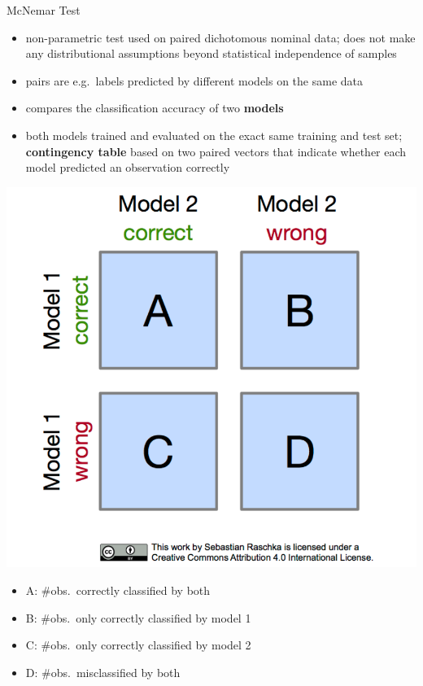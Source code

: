     \begin{frame}[c,allowframebreaks]{McNemar Test}
    \begin{itemize}
    \item non-parametric test used on paired dichotomous nominal data; does not
        make any distributional assumptions beyond statistical independence of
        samples
    \item pairs are e.g.\ labels predicted by different models on the same data
    \item compares the classification accuracy of two \textbf{models}
    \item both models trained and evaluated on the exact same training and test set;
        \textbf{contingency table} based on two paired vectors that indicate whether each model predicted an observation correctly
    \end{itemize}

    \medskip
    \begin{minipage}{0.25\textwidth}
    \includegraphics[width=\textwidth]{mcnemar_1.png}
    \end{minipage}
    \begin{minipage}{0.74\textwidth}
    \begin{itemize}
    \item A: $\#$obs.\ correctly classified by both
    \item B: $\#$obs.\ only correctly classified by model 1
    \item C: $\#$obs.\ only correctly classified by model 2
    \item D: $\#$obs.\ misclassified by both
    \end{itemize}
    \end{minipage}


\end{frame}
